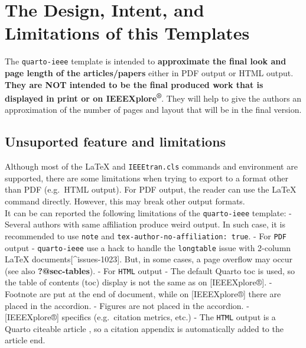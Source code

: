 \documentclass[
  journal,
]{IEEEtran}%
\begin{document}
\section{The Design, Intent, and Limitations of this
Templates}\label{the-design-intent-and-limitations-of-this-templates}

The \texttt{quarto-ieee} template is intended to \textbf{approximate the
final look and page length of the articles/papers} either in PDF output
or HTML output. \textbf{They are NOT intended to be the final produced
work that is displayed in print or on IEEEXplore\textsuperscript{®}}.
They will help to give the authors an approximation of the number of
pages and layout that will be in the final version.

\subsection{Unsuported feature and
limitations}\label{unsuported-feature-and-limitations}

Although most of the {\LaTeX} and \texttt{IEEEtran.cls} commands and
environment are supported, there are some limitations when trying to
export to a format other than PDF (e.g.~HTML output). For PDF output,
the reader can use the {\LaTeX} command directly. However, this may
break other output formats.\\
It can be can reported the following limitations of the
\texttt{quarto-ieee} template: - Several authors with same affiliation
produce weird output. In such case, it is recommended to use
\texttt{note} and \texttt{tex-author-no-affiliation:\ true}. - For
\texttt{PDF} output - \texttt{quarto-ieee} use a hack to handle the
\texttt{longtable} issue with 2-column {\LaTeX}
documents{[}\^{}issues-1023{]}. But, in some cases, a page overflow may
occur (see also \textbf{?@sec-tables}). - For \texttt{HTML} output - The
default Quarto toc is used, so the table of contents (toc) display is
not the same as on {[}IEEEXplore®{]}. - Footnote are put at the end of
document, while on {[}IEEEXplore®{]} there are placed in the accordion.
- Figures are not placed in the accordion. - {[}IEEEXplore®{]} specifics
(e.g.~citation metrics, etc.) - The \texttt{HTML} output is a Quarto
citeable article , so a citation
appendix is automatically added to the article end.
\end{document}
